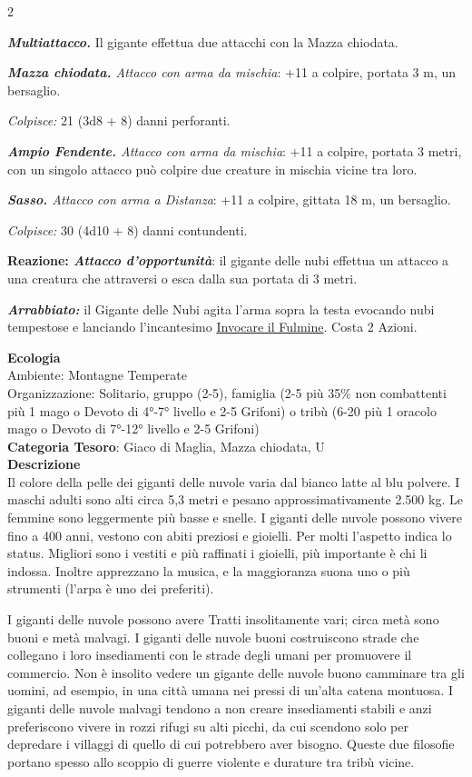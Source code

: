 \begin{multicols}{2}
{\emph{\textbf{Multiattacco.}} Il gigante effettua due attacchi con la Mazza chiodata.

\emph{\textbf{Mazza chiodata.} Attacco con arma da mischia}: +11 a colpire, portata 3 m, un bersaglio.

\emph{Colpisce:} 21 (3d8 + 8) danni perforanti.

\emph{\textbf{Ampio Fendente.} Attacco con arma da mischia}: +11 a colpire, portata 3 metri, con un singolo attacco può colpire due creature in mischia vicine tra loro.

\emph{\textbf{Sasso.} Attacco con arma a Distanza}: +11 a colpire, gittata 18 m, un bersaglio.

\emph{Colpisce:} 30 (4d10 + 8) danni contundenti.

\textbf{Reazione: \emph{Attacco d'opportunità}}: il gigante delle nubi effettua un attacco a una creatura che attraversi o esca dalla sua portata di 3 metri.

\emph{\textbf{Arrabbiato:}} il Gigante delle Nubi agita l'arma sopra la testa evocando nubi tempestose e lanciando l'incantesimo \hyperlink{Invocare il Fulmine}{Invocare il Fulmine}. Costa 2 Azioni.

\textbf{Ecologia}\\
Ambiente: Montagne Temperate\\
Organizzazione: Solitario, gruppo (2-5), famiglia (2-5 più 35\% non combattenti più 1 mago o Devoto di 4°-7° livello e 2-5 Grifoni) o tribù (6-20 più 1 oracolo mago o Devoto di 7°-12° livello e 2-5 Grifoni)\\
\textbf{Categoria Tesoro}: Giaco di Maglia, Mazza chiodata, U\\
\textbf{Descrizione}\\
Il colore della pelle dei giganti delle nuvole varia dal bianco latte al blu polvere. I maschi adulti sono alti circa 5,3 metri e pesano approssimativamente 2.500 kg. Le femmine sono leggermente più basse e snelle. I giganti delle nuvole possono vivere fino a 400 anni, vestono con abiti preziosi e gioielli. Per molti l'aspetto indica lo status. Migliori sono i vestiti e più raffinati i gioielli, più importante è chi li indossa. Inoltre apprezzano la musica, e la maggioranza suona uno o più strumenti (l'arpa è uno dei preferiti).

I giganti delle nuvole possono avere Tratti insolitamente vari; circa metà sono buoni e metà malvagi. I giganti delle nuvole buoni costruiscono strade che collegano i loro insediamenti con le strade degli umani per promuovere il commercio. Non è insolito vedere un gigante delle nuvole buono camminare tra gli uomini, ad esempio, in una città umana nei pressi di un'alta catena montuosa. I giganti delle nuvole malvagi tendono a non creare insediamenti stabili e anzi preferiscono vivere in rozzi rifugi su alti picchi, da cui scendono solo per depredare i villaggi di quello di cui potrebbero aver bisogno. Queste due filosofie portano spesso allo scoppio di guerre violente e durature tra tribù vicine.

}
\end{multicols}
